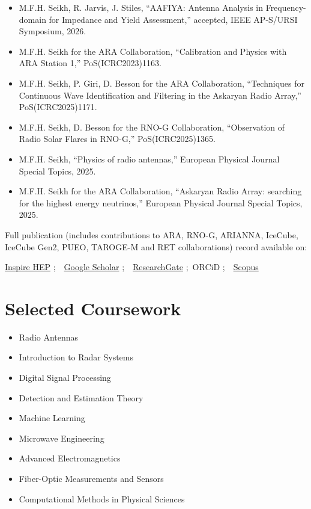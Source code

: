 \documentclass[10pt,letterpaper]{article}
\begin{document}
\begin{itemize}
    \item M.F.H. Seikh, R. Jarvis, J. Stiles, ``AAFIYA: Antenna Analysis in Frequency-domain for Impedance and Yield Assessment,'' accepted, IEEE AP-S/URSI Symposium, 2026.
    \item M.F.H. Seikh for the ARA Collaboration, ``Calibration and Physics with ARA Station 1,'' PoS(ICRC2023)1163.
    \item M.F.H. Seikh, P. Giri, D. Besson for the ARA Collaboration, ``Techniques for Continuous Wave Identification and Filtering in the Askaryan Radio Array,'' PoS(ICRC2025)1171.
    \item M.F.H. Seikh, D. Besson for the RNO-G Collaboration, ``Observation of Radio Solar Flares in RNO-G,'' PoS(ICRC2025)1365.
    \item M.F.H. Seikh, ``Physics of radio antennas,'' European Physical Journal Special Topics, 2025.
    \item M.F.H. Seikh for the ARA Collaboration, ``Askaryan Radio Array: searching for the highest energy neutrinos,'' European Physical Journal Special Topics, 2025.
\end{itemize}

Full publication (includes contributions to ARA, RNO-G, ARIANNA, IceCube, IceCube Gen2, PUEO, TAROGE-M and RET collaborations) record available on:
\begin{center}
    \href{https://inspirehep.net/authors/2014116}{Inspire HEP} ;~~\href{https://scholar.google.com/citations?user=dSwfpWQAAAAJ}{Google Scholar} ;~~\href{https://www.researchgate.net/profile/Mohammad-Ful-Hossain-Seikh}{ResearchGate} ;~ORCiD  ;~~\href{https://www.scopus.com/authid/detail.uri?authorId=57426893600}{Scopus}
\end{center}

\section*{Selected Coursework}

\begin{itemize}
    \item Radio Antennas
    \item Introduction to Radar Systems
    \item Digital Signal Processing
    \item Detection and Estimation Theory
    \item Machine Learning
    \item Microwave Engineering
    \item Advanced Electromagnetics
    \item Fiber-Optic Measurements and Sensors
    \item Computational Methods in Physical Sciences
\end{itemize}
\end{document}
